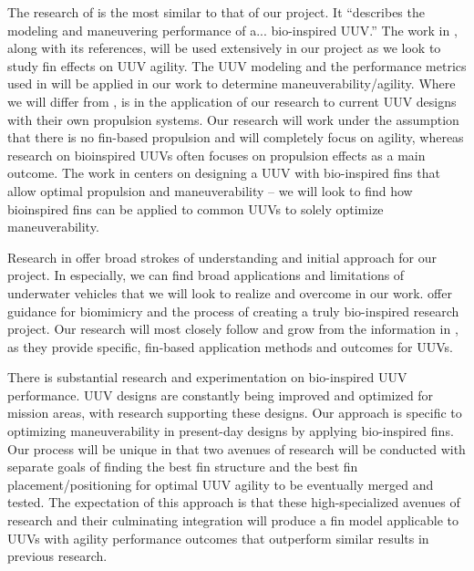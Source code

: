 \documentclass{IEEEtran}
\begin{document}
The research of \cite{hiller2012expanding} is the most similar to that of our project. It ``describes the modeling and maneuvering performance of a... bio-inspired UUV.'' The work in \cite{hiller2012expanding}, along with its references, will be used extensively in our project as we look to study fin effects on UUV agility. The UUV modeling and the performance metrics used in \cite{hiller2012expanding} will be applied in our work to determine maneuverability/agility. Where we will differ from \cite{hiller2012expanding}, is in the application of our research to current UUV designs with their own propulsion systems. Our research will work under the assumption that there is no fin-based propulsion and will completely focus on agility, whereas research on bioinspired UUVs often focuses on propulsion effects as a main outcome. The work in \cite{hiller2012expanding} centers on designing a UUV with bio-inspired fins that allow optimal propulsion and maneuverability -- we will look to find how bioinspired fins can be applied to common UUVs to solely optimize maneuverability.

Research in \cite{nrc2005autonomous, noaa2009how, maslin2020raising} offer broad strokes of understanding and initial approach for our project. In \cite{nrc2005autonomous} especially, we can find broad applications and limitations of underwater vehicles that we will look to realize and overcome in our work. \cite{noaa2009how, maslin2020raising} offer guidance for biomimicry and the process of creating a truly bio-inspired research project. Our research will most closely follow and grow from the information in \cite{berenice2018splash, orourke2020navy, hiller2012expanding}, as they provide specific, fin-based application methods and outcomes for UUVs.

There is substantial research and experimentation on bio-inspired UUV performance. UUV designs are constantly being improved and optimized for mission areas, with research supporting these designs. Our approach is specific to optimizing maneuverability in present-day designs by applying bio-inspired fins. Our process will be unique in that two avenues of research will be conducted with separate goals of finding the best fin structure and the best fin placement/positioning for optimal UUV agility to be eventually merged and tested. The expectation of this approach is that these high-specialized avenues of research and their culminating integration will produce a fin model applicable to UUVs with agility performance outcomes that outperform similar results in previous research.
\end{document}
